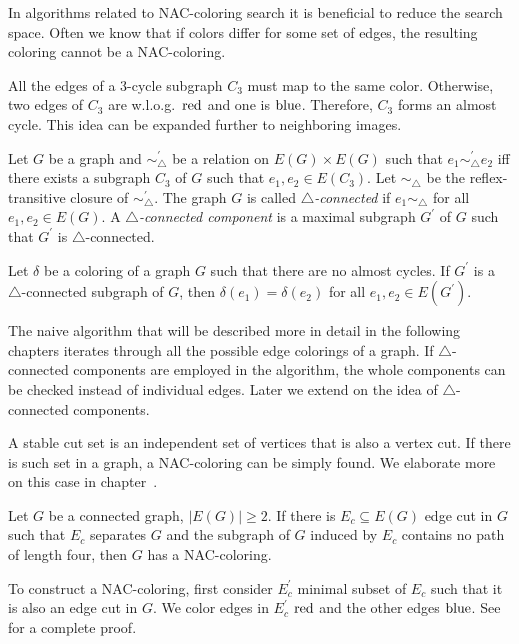 In algorithms related to NAC-coloring search it is beneficial
to reduce the search space. Often we know that if colors differ for some
set of edges, the resulting coloring cannot be a NAC-coloring.

All the edges of a 3-cycle subgraph \( C_3 \) must map to the same color.
Otherwise, two edges of \( C_3 \) are w.l.o.g.\ \( \text{red} \) and one is \( \text{blue} \).
Therefore, \( C_3 \) forms an almost cycle.
This idea can be expanded further to neighboring images.
%
\begin{definition}
	Let \( G \) be a graph and \( \sim^\prime_\triangle \) be
	a relation on \( E(G) \times E(G) \) such that \( e_1 \sim^\prime_\triangle e_2 \)
	iff there exists a subgraph \( C_3 \) of \( G \)
	such that \( e_1, e_2 \in E(C_3) \).
	Let \( \sim_\triangle \) be the reflex-transitive closure of \( \sim^\prime_\triangle \).
	The graph \( G \) is called \emph{\( \triangle \)-connected} if \( e_1 \sim_\triangle \)
	for all \( e_1, e_2 \in E(G) \).
	A \emph{\( \triangle \)-connected component} is a maximal subgraph \( G^\prime \) of \( G \) such
	that \( G^\prime \) is \( \triangle \)-connected.
\end{definition}
%
\begin{lemma}
	Let \( \delta \) be a coloring of a graph \( G \) such that there are
	no almost cycles. If \( G^\prime \) is
	a \( \triangle \)-connected subgraph of \( G \),
	then \( \delta(e_1) = \delta(e_2) \) for all \( e_1, e_2 \in E(G^\prime) \).
\end{lemma}
%
The naive algorithm that will be described more in detail in the following chapters
iterates through all the possible edge colorings of a graph.
If \( \triangle \)-connected components are employed in the algorithm,
the whole components can be checked instead of individual edges.
Later we extend on the idea of \( \triangle \)-connected components.

A stable cut set is an independent set of vertices that is also a vertex cut.
If there is such set in a graph, a NAC-coloring can be simply found.
We elaborate more on this case in chapter~.

%
\begin{lemma}
	Let \( G \) be a connected graph, \( |E(G)| \ge 2 \). If there is \( E_c \subseteq E(G) \)
	edge cut in \( G \) such that \( E_c \) separates \( G \) and the subgraph of \( G \)
	induced by \( E_c \) contains no path of length four, then \( G \) has a NAC-coloring.
\end{lemma}
%
To construct a NAC-coloring, first consider \( E_c^\prime \) minimal subset of \( E_c \)
such that it is also an edge cut in \( G \).
We color edges in \( E_c^\prime \) \( \text{red} \) and the other edges \( \text{blue} \).
See~\cite{legersky_original} for a complete proof.

